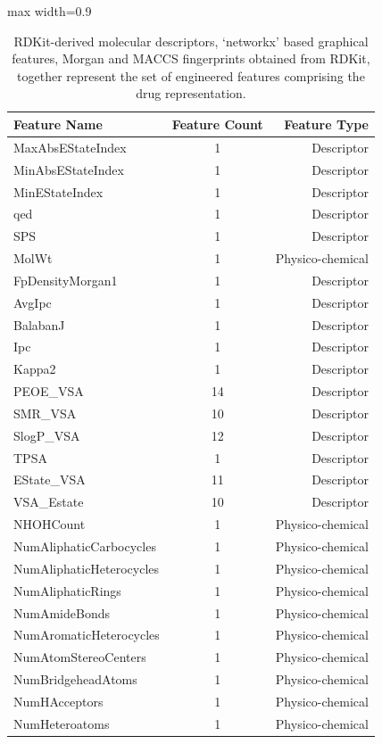 \documentclass[sigconf,authordraft]{acmart}
\begin{document}
\begin{table}[!ht]
\centering
\caption{RDKit-derived molecular descriptors, `networkx' based graphical features, Morgan and MACCS fingerprints obtained from RDKit, together represent the set of engineered features comprising the drug representation.}
\label{tab:drug_features}
\scriptsize
\begin{adjustbox}{max width=0.9\linewidth}
\begin{tabular}{|l|c|r|}
\toprule
\textbf{Feature Name} & \textbf{Feature Count} & \textbf{Feature Type} \\
\midrule
MaxAbsEStateIndex & 1 & Descriptor \\
MinAbsEStateIndex & 1 & Descriptor \\
MinEStateIndex & 1 & Descriptor \\
qed & 1 & Descriptor \\
SPS & 1 & Descriptor \\
MolWt & 1 & Physico-chemical \\
FpDensityMorgan1 & 1 & Descriptor \\
AvgIpc & 1 & Descriptor \\
BalabanJ & 1 & Descriptor \\
Ipc & 1 & Descriptor \\
Kappa2 & 1 & Descriptor \\
PEOE\_VSA & 14 & Descriptor \\
SMR\_VSA & 10 & Descriptor \\
SlogP\_VSA & 12 & Descriptor \\
TPSA & 1 & Descriptor \\
EState\_VSA & 11 & Descriptor \\
VSA\_Estate & 10 & Descriptor \\
NHOHCount & 1 & Physico-chemical \\
NumAliphaticCarbocycles & 1 & Physico-chemical \\
NumAliphaticHeterocycles & 1 & Physico-chemical \\
NumAliphaticRings & 1 & Physico-chemical \\
NumAmideBonds & 1 & Physico-chemical \\
NumAromaticHeterocycles & 1 & Physico-chemical \\
NumAtomStereoCenters & 1 & Physico-chemical \\
NumBridgeheadAtoms & 1 & Physico-chemical \\
NumHAcceptors & 1 & Physico-chemical \\
NumHeteroatoms & 1 & Physico-chemical \\

\end{tabular}
\end{adjustbox}
\end{table}
\end{document}

